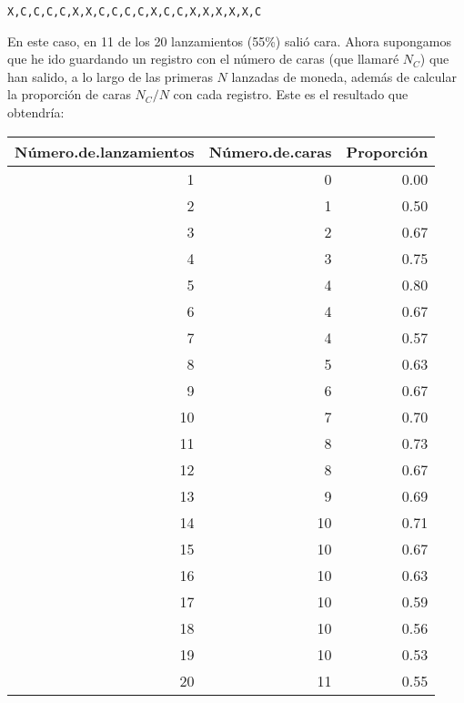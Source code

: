 \documentclass[spanish,]{book}
\begin{document}
\begin{verbatim}
X,C,C,C,C,X,X,C,C,C,C,X,C,C,X,X,X,X,X,C
\end{verbatim}

En este caso, en 11 de los 20 lanzamientos (55\%) salió cara. Ahora
supongamos que he ido guardando un registro con el número de caras (que
llamaré \(N_C\)) que han salido, a lo largo de las primeras \(N\)
lanzadas de moneda, además de calcular la proporción de caras
\(N_C / N\) con cada registro. Este es el resultado que obtendría:

\begin{tabular}{r|r|r}
\hline
Número.de.lanzamientos & Número.de.caras & Proporción\\
\hline
1 & 0 & 0.00\\
\hline
2 & 1 & 0.50\\
\hline
3 & 2 & 0.67\\
\hline
4 & 3 & 0.75\\
\hline
5 & 4 & 0.80\\
\hline
6 & 4 & 0.67\\
\hline
7 & 4 & 0.57\\
\hline
8 & 5 & 0.63\\
\hline
9 & 6 & 0.67\\
\hline
10 & 7 & 0.70\\
\hline
11 & 8 & 0.73\\
\hline
12 & 8 & 0.67\\
\hline
13 & 9 & 0.69\\
\hline
14 & 10 & 0.71\\
\hline
15 & 10 & 0.67\\
\hline
16 & 10 & 0.63\\
\hline
17 & 10 & 0.59\\
\hline
18 & 10 & 0.56\\
\hline
19 & 10 & 0.53\\
\hline
20 & 11 & 0.55\\
\hline
\end{tabular}
\end{document}
